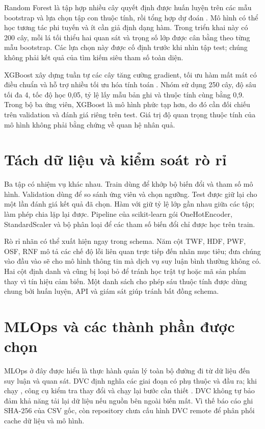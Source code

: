 Random Forest là tập hợp nhiều cây quyết định được huấn luyện trên các mẫu bootstrap và lựa chọn tập con thuộc tính, rồi tổng hợp dự đoán \cite{breiman2001}. Mô hình có thể học tương tác phi tuyến và ít cần giả định dạng hàm. Trong triển khai này có 200 cây, mỗi lá tối thiểu hai quan sát và trọng số lớp được cân bằng theo từng mẫu bootstrap. Các lựa chọn này được cố định trước khi nhìn tập test; chúng không phải kết quả của tìm kiếm siêu tham số toàn diện.

XGBoost xây dựng tuần tự các cây tăng cường gradient, tối ưu hàm mất mát có điều chuẩn và hỗ trợ nhiều tối ưu hóa tính toán \cite{chen2016}. Nhóm sử dụng 250 cây, độ sâu tối đa 4, tốc độ học 0,05, tỷ lệ lấy mẫu bản ghi và thuộc tính cùng bằng 0,9. Trong bộ ba ứng viên, XGBoost là mô hình phức tạp hơn, do đó cần đối chiếu trên validation và đánh giá riêng trên test. Giá trị độ quan trọng thuộc tính của mô hình không phải bằng chứng về quan hệ nhân quả.

\section{Tách dữ liệu và kiểm soát rò rỉ}
Ba tập có nhiệm vụ khác nhau. Train dùng để khớp bộ biến đổi và tham số mô hình. Validation dùng để so sánh ứng viên và chọn ngưỡng. Test được giữ lại cho một lần đánh giá kết quả đã chọn. Hàm  với  giữ tỷ lệ lớp gần nhau giữa các tập;  làm phép chia lặp lại được. Pipeline của scikit-learn gói OneHotEncoder, StandardScaler và bộ phân loại để các tham số biến đổi chỉ được học trên train.

Rò rỉ nhãn có thể xuất hiện ngay trong schema. Năm cột TWF, HDF, PWF, OSF, RNF mô tả các chế độ lỗi liên quan trực tiếp đến nhãn mục tiêu; đưa chúng vào đầu vào sẽ cho mô hình thông tin mà dịch vụ suy luận bình thường không có. Hai cột định danh  và  cũng bị loại bỏ để tránh học trật tự hoặc mã sản phẩm thay vì tín hiệu cảm biến. Một danh sách cho phép sáu thuộc tính được dùng chung bởi huấn luyện, API và giám sát giúp tránh bất đồng schema.

\section{MLOps và các thành phần được chọn}
MLOps ở đây được hiểu là thực hành quản lý toàn bộ đường đi từ dữ liệu đến suy luận và quan sát. DVC định nghĩa các giai đoạn có phụ thuộc và đầu ra; khi chạy , công cụ kiểm tra thay đổi và chạy lại bước cần thiết \cite{dvc}. DVC không tự bảo đảm khả năng tải lại dữ liệu nếu nguồn bên ngoài biến mất. Vì thế báo cáo ghi SHA-256 của CSV gốc, còn repository chưa cấu hình DVC remote để phân phối cache dữ liệu và mô hình.

